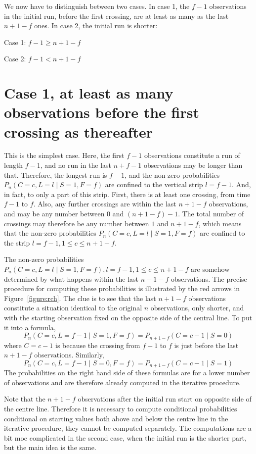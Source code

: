 We now have to distinguish between two cases. In case 1, the $f-1$ observations in the initial run,  before the first crossing, are at least as many as the last $n+1-f$ ones. In case 2, the initial run is shorter:

Case 1: $f-1 \geq n+1-f$

Case 2: $f-1<n+1-f$

\section{Case 1, at least as many observations before the first crossing as thereafter}

This is the simplest case. Here, the first $f-1$ observations constitute a run of length $f-1$, and no run in the last $n+f-1$ observations may be longer than that. Therefore, the longest run is $f-1$, and the non-zero probabilities $P_n (C=c,L=l \mid S=1,F=f)$ are confined to the vertical strip $l=f-1$. And, in fact, to only a part of this strip. First, there is at least one crossing, from time $f-1$ to $f$. Also, any further crossings are within the last $n+1-f$ observations, and may be any number between $0$ and $(n+1-f) - 1$. The total number of crossings may therefore be any number between $1$ and $n+1-f$, which means that the non-zero probabilities $P_n (C=c,L=l \mid S=1,F=f)$ are confined to the strip $l=f-1, 1 \leq c \leq n+1-f$. 

The non-zero probabilities $P_n (C=c,L=l \mid S=1,F=f), l=f-1, 1 \leq c \leq n+1-f$ are somehow determined by what happens within the last $n+1-f$ observations. The precise procedure for computing these probabilities is illustrated by the red arrows in Figure~\ref{figure:rch}. The clue is to see that the last $n+1-f$ observations constitute a situation identical to the original $n$ observations, only shorter, and with the starting observation fixed on the opposite side of the central line. To put it into a formula, $$P_n (C=c,L=f-1 \mid S=1,F=f)=P_{n+1-f} (C=c-1 \mid S=0)$$ where $C=c-1$ is because the crossing from $f-1$ to $f$ is just before the last $n+1-f$ observations. Similarly, $$P_n (C=c,L=f-1 \mid S=0,F=f)=P_{n+1-f} (C=c-1 \mid S=1)$$ The probabilities on the right hand side of these formulas are for a lower number of observations and are therefore already computed in the iterative procedure. 

Note that the $n+1-f$ observations after the initial run start on opposite side of the centre line. Therefore it is necessary to compute conditional probabilities conditional on starting values both above and below the centre line in the iterative procedure, they cannot be computed separately. The computations are a bit moe complicated in the second case, when the initial run is the shorter part, but the main idea is the same.

